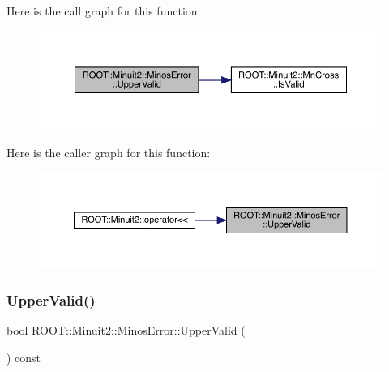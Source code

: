 Here is the call graph for this function\+:
\nopagebreak
\begin{figure}[H]
\begin{center}
\leavevmode
\includegraphics[width=350pt]{d2/dd1/classROOT_1_1Minuit2_1_1MinosError_a4180ae7ff87d9a2c0942c8e6ac81a8c0_cgraph}
\end{center}
\end{figure}
Here is the caller graph for this function\+:
\nopagebreak
\begin{figure}[H]
\begin{center}
\leavevmode
\includegraphics[width=350pt]{d2/dd1/classROOT_1_1Minuit2_1_1MinosError_a4180ae7ff87d9a2c0942c8e6ac81a8c0_icgraph}
\end{center}
\end{figure}
\mbox{\label{classROOT_1_1Minuit2_1_1MinosError_a4180ae7ff87d9a2c0942c8e6ac81a8c0}} 
\subsubsection{\texorpdfstring{UpperValid()}{UpperValid()}\hspace{0.1cm}{\footnotesize\ttfamily [2/3]}}
{\footnotesize\ttfamily bool R\+O\+O\+T\+::\+Minuit2\+::\+Minos\+Error\+::\+Upper\+Valid (\begin{DoxyParamCaption}{ }\end{DoxyParamCaption}) const\hspace{0.3cm}{\ttfamily [inline]}}

